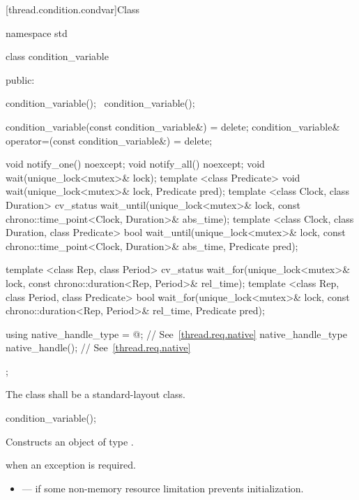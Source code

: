 [thread.condition.condvar]{Class }

%
\begin{codeblock}
namespace std {
  class condition_variable {
  public:

    condition_variable();
    ~condition_variable();

    condition_variable(const condition_variable&) = delete;
    condition_variable& operator=(const condition_variable&) = delete;

    void notify_one() noexcept;
    void notify_all() noexcept;
    void wait(unique_lock<mutex>& lock);
    template <class Predicate>
      void wait(unique_lock<mutex>& lock, Predicate pred);
    template <class Clock, class Duration>
      cv_status wait_until(unique_lock<mutex>& lock,
                           const chrono::time_point<Clock, Duration>& abs_time);
    template <class Clock, class Duration, class Predicate>
      bool wait_until(unique_lock<mutex>& lock,
                      const chrono::time_point<Clock, Duration>& abs_time,
                      Predicate pred);

    template <class Rep, class Period>
      cv_status wait_for(unique_lock<mutex>& lock,
                         const chrono::duration<Rep, Period>& rel_time);
    template <class Rep, class Period, class Predicate>
      bool wait_for(unique_lock<mutex>& lock,
                    const chrono::duration<Rep, Period>& rel_time,
                    Predicate pred);

    using native_handle_type = @\impdefnc@; // See~\ref{thread.req.native}
    native_handle_type native_handle();                // See~\ref{thread.req.native}
  };
}
\end{codeblock}

\pnum
The class  shall be a standard-layout class.

%
\begin{itemdecl}
condition_variable();
\end{itemdecl}

\begin{itemdescr}
\pnum
\effects Constructs an object of type .

\pnum
\throws {} when an exception is required.

\pnum
\errors
\begin{itemize}
\item {} --- if some non-memory resource
limitation prevents initialization.
\end{itemize}
\end{itemdescr}

